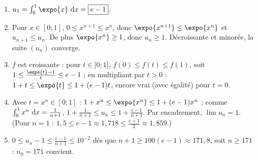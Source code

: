\begin{corrige}
\begin{sol}
\begin{description}
\begin{enumerate}
      \item $u_1 = \int_0^1 \expo{x}\dx = \boxed{e - 1}$.
      \item Pour $x \in [0 ; 1]$, $0 \leq x^{n+1} \leq x^n$, donc $\expo{x^{n+1}} \leq \expo{x^n}$ et $u_{n+1} \leq u_n$.
            De plus $\expo{x^n} \geq 1$, donc $u_n \geq 1$. D\'ecroissante et minor\'ee, la suite $(u_n)$ converge.
      \item $f$ est croissante : pour $t \in ]0 ; 1]$, $f(0) \leq f(t) \leq f(1)$, soit $1 \leq \frac{\expo{t} - 1}{t} \leq e - 1$ ;
            en multipliant par $t > 0$ : $1 + t \leq \expo{t} \leq 1 + (e - 1)t$, encore vrai (avec \'egalit\'e) pour $t = 0$.
      \item Avec $t = x^n \in [0 ; 1]$ : $1 + x^n \leq \expo{x^n} \leq 1 + (e - 1)x^n$ ; comme $\int_0^1 x^n~\mathrm{d}x = \frac{1}{n+1}$,
            $1 + \frac{1}{n+1} \leq u_n \leq 1 + \frac{e - 1}{n + 1}$. Par encadrement, $\boxed{\lim u_n = 1}$.
            (Pour $n = 1$ : $1{,}5 \leq e - 1 \approx 1{,}718 \leq \frac{e+1}{2} \approx 1{,}859$.)
      \item $0 \leq u_n - 1 \leq \frac{e-1}{n+1} \leq 10^{-2}$ d\`es que $n + 1 \geq 100(e - 1) \approx 171{,}8$, soit $n \geq 171$ :
            $\boxed{n_0 = 171}$ convient.
      \end{enumerate}
\end{description}
\end{sol}


\end{corrige}
